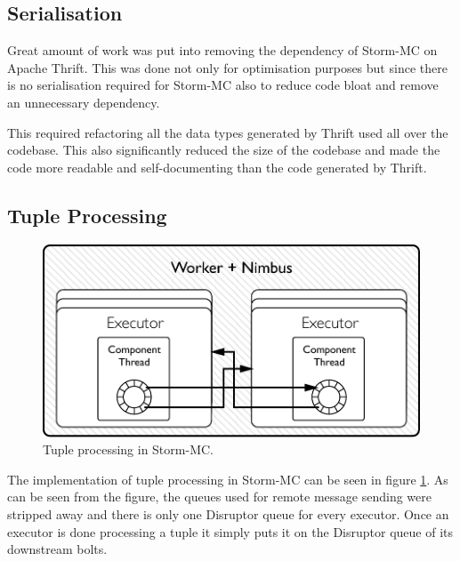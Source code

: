 \subsection{Serialisation}

Great amount of work was put into removing the dependency of Storm-MC on Apache Thrift. This was done not only for optimisation purposes but since there is no serialisation required for Storm-MC also to reduce code bloat and remove an unnecessary dependency.

This required refactoring all the data types generated by Thrift used all over the codebase. This also significantly reduced the size of the codebase and made the code more readable and self-documenting than the code generated by Thrift.



%

\subsection{Tuple Processing}

\begin{figure}[!htb]
	\centering
	\includegraphics[scale=0.7]{pdf/worker_inside_mc.pdf}
	\caption{Tuple processing in Storm-MC.}
	\label{fig:worker_inside_mc}
\end{figure}

The implementation of tuple processing in Storm-MC can be seen in figure \ref{fig:worker_inside_mc}. As can be seen from the figure, the queues used for remote message sending were stripped away and there is only one Disruptor queue for every executor. Once an executor is done processing a tuple it simply puts it on the Disruptor queue of its downstream bolts.

